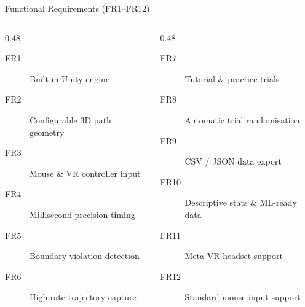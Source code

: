 \documentclass[aspectratio=169, 10pt]{beamer}
\begin{document}
\begin{frame}{Functional Requirements (FR1--FR12)}
  \small
  \begin{columns}[T]
    \begin{column}{0.48\textwidth}
      \begin{description}
        \item[FR1] Built in Unity engine
        \item[FR2] Configurable 3D path geometry
        \item[FR3] Mouse \& VR controller input
        \item[FR4] Millisecond-precision timing
        \item[FR5] Boundary violation detection
        \item[FR6] High-rate trajectory capture
      \end{description}
    \end{column}
    \begin{column}{0.48\textwidth}
      \begin{description}
        \item[FR7] Tutorial \& practice trials
        \item[FR8] Automatic trial randomisation
        \item[FR9] CSV / JSON data export
        \item[FR10] Descriptive stats \& ML-ready data
        \item[FR11] Meta VR headset support
        \item[FR12] Standard mouse input support
      \end{description}
    \end{column}
  \end{columns}
\end{frame}
\end{document}

